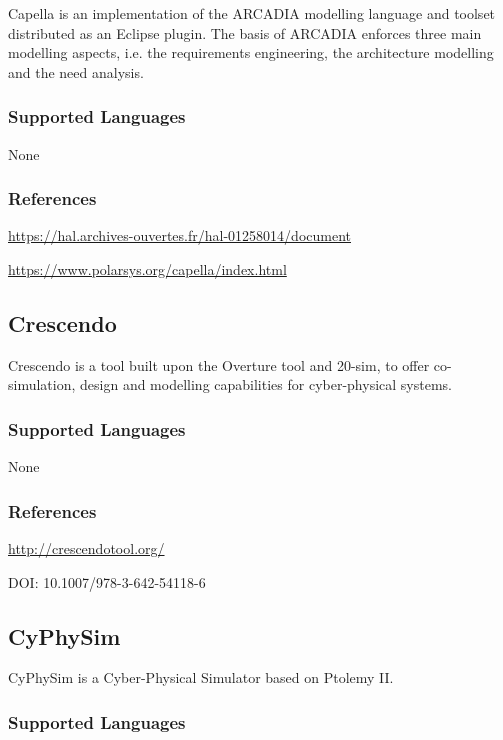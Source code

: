 Capella is an implementation of the ARCADIA modelling language and toolset distributed as an Eclipse plugin.
The basis of ARCADIA enforces three main modelling aspects, i.e. the requirements engineering, the architecture modelling and the need analysis.

\subsubsection{Supported Languages}

None


\subsubsection{References}

\url{https://hal.archives-ouvertes.fr/hal-01258014/document}

\url{https://www.polarsys.org/capella/index.html}



\subsection{Crescendo}
\label{subsecT:Crescendo}


Crescendo is a tool built upon the Overture tool and 20-sim, to offer co-simulation, design and modelling capabilities for cyber-physical systems.

\subsubsection{Supported Languages}

None


\subsubsection{References}

\url{http://crescendotool.org/}

DOI: 10.1007/978-3-642-54118-6




\subsection{CyPhySim}
\label{subsecT:CyPhySim}

CyPhySim is a Cyber-Physical Simulator based on Ptolemy II.

\subsubsection{Supported Languages}

